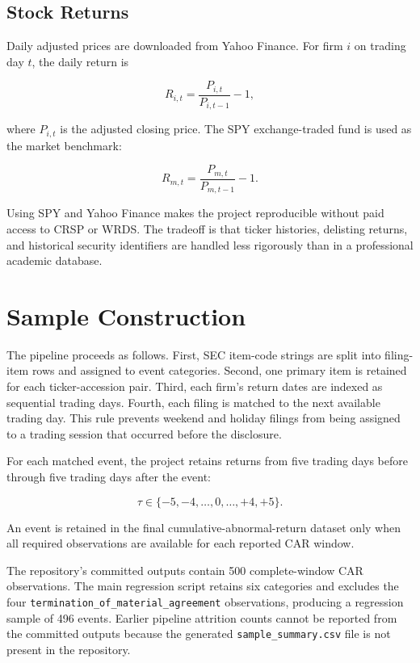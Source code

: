 \documentclass[12pt]{article}
\begin{document}
\subsection{Stock Returns}

Daily adjusted prices are downloaded from Yahoo Finance. For firm $i$ on trading day $t$, the daily return is

\begin{equation}
R_{i,t}=\frac{P_{i,t}}{P_{i,t-1}}-1,
\end{equation}

where $P_{i,t}$ is the adjusted closing price. The SPY exchange-traded fund is used as the market benchmark:

\begin{equation}
R_{m,t}=\frac{P_{m,t}}{P_{m,t-1}}-1.
\end{equation}

Using SPY and Yahoo Finance makes the project reproducible without paid access to CRSP or WRDS. The tradeoff is that ticker histories, delisting returns, and historical security identifiers are handled less rigorously than in a professional academic database.

\section{Sample Construction}

The pipeline proceeds as follows. First, SEC item-code strings are split into filing-item rows and assigned to event categories. Second, one primary item is retained for each ticker-accession pair. Third, each firm's return dates are indexed as sequential trading days. Fourth, each filing is matched to the next available trading day. This rule prevents weekend and holiday filings from being assigned to a trading session that occurred before the disclosure.

For each matched event, the project retains returns from five trading days before through five trading days after the event:

\[
\tau\in\{-5,-4,\ldots,0,\ldots,+4,+5\}.
\]

An event is retained in the final cumulative-abnormal-return dataset only when all required observations are available for each reported CAR window.

The repository's committed outputs contain 500 complete-window CAR observations. The main regression script retains six categories and excludes the four \texttt{termination\_of\_material\_agreement} observations, producing a regression sample of 496 events. Earlier pipeline attrition counts cannot be reported from the committed outputs because the generated \texttt{sample\_summary.csv} file is not present in the repository.
\end{document}
